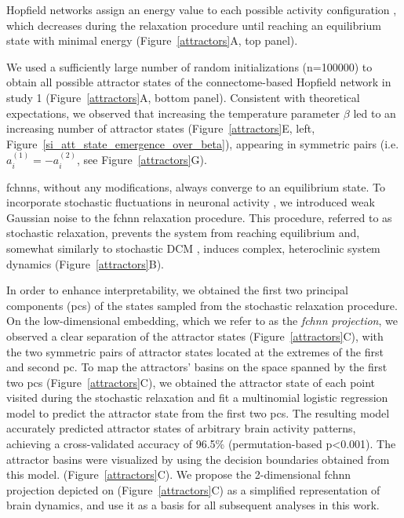 \documentclass{article}
\begin{document}
Hopfield networks assign an energy value to each possible activity configuration \citep{hopfield1982neural, koiran1994dynamics}, which decreases during the relaxation procedure until reaching an equilibrium state with minimal energy (Figure~\ref{attractors}A, top panel).

We used a sufficiently large number of random initializations (n=100000) to obtain all possible attractor states of the connectome-based Hopfield network in study 1 (Figure~\ref{attractors}A, bottom panel).
Consistent with theoretical expectations, we observed that increasing the temperature parameter $\beta$ led to an
increasing number of attractor states (Figure~\ref{attractors}E, left, Figure~\ref{si_att_state_emergence_over_beta}), appearing in symmetric pairs (i.e. $a_i^{(1)} = -a_i^{(2)}$, see Figure~\ref{attractors}G).

\acrshort{fchnn}s, without any modifications, always converge to an equilibrium state.
To incorporate stochastic fluctuations in neuronal activity \citep{robinson2005multiscale}, we introduced weak
Gaussian noise to the \acrshort{fchnn} relaxation procedure. This procedure, referred to as stochastic relaxation, prevents the system from reaching equilibrium and, somewhat similarly to stochastic DCM \citep{daunizeau2012stochastic}, induces complex, heteroclinic system dynamics (Figure~\ref{attractors}B).

In order to enhance interpretability, we obtained the first two principal components (\acrshort{pc}s) of the states sampled from the stochastic relaxation procedure. On the low-dimensional embedding, which we refer to as the \textit{\acrshort{fchnn} projection}, we observed a clear separation of the attractor states (Figure~\ref{attractors}C), with the two symmetric pairs of attractor states located at the extremes of the first and second \acrshort{pc}.
To map the attractors' basins on the space spanned by the first two \acrshort{pc}s (Figure~\ref{attractors}C), we obtained the attractor state of each point visited during the stochastic relaxation and fit a multinomial logistic regression model to predict the attractor state from the first two \acrshort{pc}s.
The resulting model accurately predicted attractor states of arbitrary brain activity patterns, achieving a cross-validated accuracy of 96.5\% (permutation-based p\textless 0.001).
The attractor basins were visualized by using the decision boundaries obtained from this model. (Figure~\ref{attractors}C). We propose the 2-dimensional \acrshort{fchnn} projection depicted on (Figure~\ref{attractors}C) as a simplified representation of brain dynamics, and use it as a basis for all subsequent analyses in this work.
\end{document}
